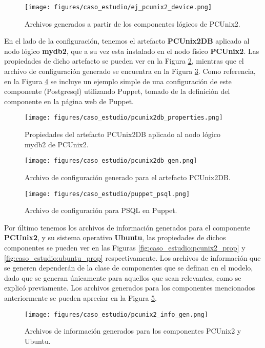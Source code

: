 \begin{figure}[htbp]
    \centering
    \texttt{[image: figures/caso\_estudio/ej\_pcunix2\_device.png]}
    \caption{Archivos generados a partir de los componentes lógicos de PCUnix2.}
    \label{fig:caso_estudio:pcunix2_device}
\end{figure}

En el lado de la configuración, tenemos el artefacto \textbf{PCUnix2DB} aplicado al nodo lógico \textbf{mydb2}, que a su vez esta instalado en el nodo físico \textbf{PCUnix2}. Las propiedades de dicho artefacto se pueden ver en la Figura \ref{fig:caso_estudio:pcunix2db_prop}, mientras que el archivo de configuración generado se encuentra en la Figura \ref{fig:caso_estudio:pcunix2db_gen}. Como referencia, en la Figura \ref{fig:caso_estudio:puppet_psql} se incluye un ejemplo simple de una configuración de este componente (Postgresql) utilizando Puppet, tomado de la definición del componente en la página web de Puppet. \cite{puppet_psql}

\begin{figure}[htbp]
    \centering
    \texttt{[image: figures/caso\_estudio/pcunix2db\_properties.png]}
    \caption{Propiedades del artefacto PCUnix2DB aplicado al nodo lógico mydb2 de PCUnix2.}
    \label{fig:caso_estudio:pcunix2db_prop}
\end{figure}

\begin{figure}[htbp]
    \centering
    \texttt{[image: figures/caso\_estudio/pcunix2db\_gen.png]}
    \caption{Archivo de configuración generado para el artefacto PCUnix2DB.}
    \label{fig:caso_estudio:pcunix2db_gen}
\end{figure}

\begin{figure}[htbp]
    \centering
    \texttt{[image: figures/caso\_estudio/puppet\_psql.png]}
    \caption{Archivo de configuración para PSQL en Puppet.}
    \label{fig:caso_estudio:puppet_psql}
\end{figure}

Por último tenemos los archivos de información generados para el componente \textbf{PCUnix2}, y su sistema operativo \textbf{Ubuntu}, las propiedades de dichos componentes se pueden ver en las Figuras \ref{fig:caso_estudio:pcunix2_prop} y \ref{fig:caso_estudio:ubuntu_prop} respectivamente. Los archivos de información que se generen dependerán de la clase de componentes que se definan en el modelo, dado que se generan únicamente para aquellos que sean relevantes, como se explicó previamente. Los archivos generados para los componentes mencionados anteriormente se pueden apreciar en la Figura \ref{fig:caso_estudio:pcunix2_info_gen}.

\begin{figure}[htbp]
    \centering
    \texttt{[image: figures/caso\_estudio/pcunix2\_info\_gen.png]}
    \caption{Archivos de información generados para los componentes PCUnix2 y Ubuntu.}
    \label{fig:caso_estudio:pcunix2_info_gen}
\end{figure}

